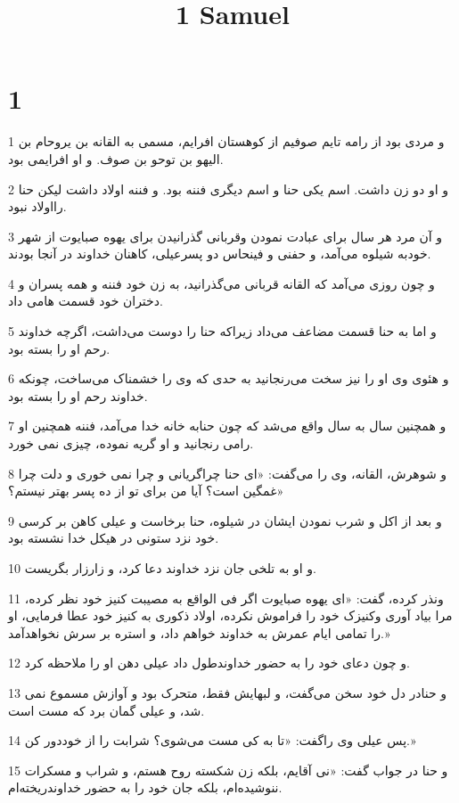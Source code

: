 

\title{1 Samuel}

 
\chapter{1}

\par 1 و مردی بود از رامه تایم صوفیم از کوهستان افرایم، مسمی به القانه بن یروحام بن الیهو بن توحو بن صوف. و او افرایمی بود.
\par 2 و او دو زن داشت. اسم یکی حنا و اسم دیگری فننه بود. و فننه اولاد داشت لیکن حنا رااولاد نبود.
\par 3 و آن مرد هر سال برای عبادت نمودن وقربانی گذرانیدن برای یهوه صبایوت از شهر خودبه شیلوه می‌آمد، و حفنی و فینحاس دو پسرعیلی، کاهنان خداوند در آنجا بودند.
\par 4 و چون روزی می‌آمد که القانه قربانی می‌گذرانید، به زن خود فننه و همه پسران و دختران خود قسمت هامی داد.
\par 5 و اما به حنا قسمت مضاعف می‌داد زیراکه حنا را دوست می‌داشت، اگر‌چه خداوند رحم او را بسته بود.
\par 6 و هئوی وی او را نیز سخت می‌رنجانید به حدی که وی را خشمناک می‌ساخت، چونکه خداوند رحم او را بسته بود.
\par 7 و همچنین سال به سال واقع می‌شد که چون حنابه خانه خدا می‌آمد، فننه همچنین او رامی رنجانید و او گریه نموده، چیزی نمی خورد.
\par 8 و شوهرش، القانه، وی را می‌گفت: «ای حنا چراگریانی و چرا نمی خوری و دلت چرا غمگین است؟ آیا من برای تو از ده پسر بهتر نیستم؟»
\par 9 و بعد از اکل و شرب نمودن ایشان در شیلوه، حنا برخاست و عیلی کاهن بر کرسی خود نزد ستونی در هیکل خدا نشسته بود.
\par 10 و او به تلخی جان نزد خداوند دعا کرد، و زارزار بگریست.
\par 11 ونذر کرده، گفت: «ای یهوه صبایوت اگر فی الواقع به مصیبت کنیز خود نظر کرده، مرا بیاد آوری وکنیزک خود را فراموش نکرده، اولاد ذکوری به کنیز خود عطا فرمایی، او را تمامی ایام عمرش به خداوند خواهم داد، و استره بر سرش نخواهدآمد.»
\par 12 و چون دعای خود را به حضور خداوندطول داد عیلی دهن او را ملاحظه کرد.
\par 13 و حنادر دل خود سخن می‌گفت، و لبهایش فقط، متحرک بود و آوازش مسموع نمی شد، و عیلی گمان برد که مست است.
\par 14 پس عیلی وی راگفت: «تا به کی مست می‌شوی؟ شرابت را از خوددور کن.»
\par 15 و حنا در جواب گفت: «نی آقایم، بلکه زن شکسته روح هستم، و شراب و مسکرات ننوشیده‌ام، بلکه جان خود را به حضور خداوندریخته‌ام.
